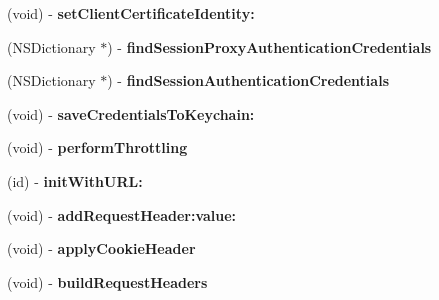 \begin{DoxyCompactItemize}
\item 
\hypertarget{interface_a_s_i_h_t_t_p_request_a4f24e48396e06b8a81de111e19c1314a}{
(void) -\/ {\bfseries set\-Client\-Certificate\-Identity\-:}}
\label{interface_a_s_i_h_t_t_p_request_a4f24e48396e06b8a81de111e19c1314a}

\item 
\hypertarget{interface_a_s_i_h_t_t_p_request_a480d62ba0d9ba8d1a64b25b45fb2d965}{
(\-N\-S\-Dictionary $\ast$) -\/ {\bfseries find\-Session\-Proxy\-Authentication\-Credentials}}
\label{interface_a_s_i_h_t_t_p_request_a480d62ba0d9ba8d1a64b25b45fb2d965}

\item 
\hypertarget{interface_a_s_i_h_t_t_p_request_a0f38ffc0ae199e83262895f640c9c263}{
(\-N\-S\-Dictionary $\ast$) -\/ {\bfseries find\-Session\-Authentication\-Credentials}}
\label{interface_a_s_i_h_t_t_p_request_a0f38ffc0ae199e83262895f640c9c263}

\item 
\hypertarget{interface_a_s_i_h_t_t_p_request_a3a57684f5aba49781ec3c9c9ef1516a6}{
(void) -\/ {\bfseries save\-Credentials\-To\-Keychain\-:}}
\label{interface_a_s_i_h_t_t_p_request_a3a57684f5aba49781ec3c9c9ef1516a6}

\item 
\hypertarget{interface_a_s_i_h_t_t_p_request_a510b47cc1be0b9c1968a9c8cc3859038}{
(void) -\/ {\bfseries perform\-Throttling}}
\label{interface_a_s_i_h_t_t_p_request_a510b47cc1be0b9c1968a9c8cc3859038}

\item 
\hypertarget{interface_a_s_i_h_t_t_p_request_aec75eeba26544a9da35e795011fe4a42}{
(id) -\/ {\bfseries init\-With\-U\-R\-L\-:}}
\label{interface_a_s_i_h_t_t_p_request_aec75eeba26544a9da35e795011fe4a42}

\item 
\hypertarget{interface_a_s_i_h_t_t_p_request_a0e969f091acb07bbbe6dbc9295260d64}{
(void) -\/ {\bfseries add\-Request\-Header\-:value\-:}}
\label{interface_a_s_i_h_t_t_p_request_a0e969f091acb07bbbe6dbc9295260d64}

\item 
\hypertarget{interface_a_s_i_h_t_t_p_request_a96645d25afb711168d8722089ad0da60}{
(void) -\/ {\bfseries apply\-Cookie\-Header}}
\label{interface_a_s_i_h_t_t_p_request_a96645d25afb711168d8722089ad0da60}

\item 
\hypertarget{interface_a_s_i_h_t_t_p_request_a84fd344945df932bb1499066a6136b44}{
(void) -\/ {\bfseries build\-Request\-Headers}}
\label{interface_a_s_i_h_t_t_p_request_a84fd344945df932bb1499066a6136b44}


\end{DoxyCompactItemize}
